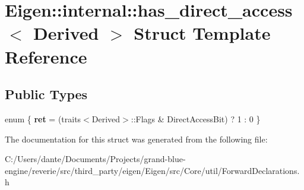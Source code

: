 \hypertarget{struct_eigen_1_1internal_1_1has__direct__access}{}\section{Eigen\+::internal\+::has\+\_\+direct\+\_\+access$<$ Derived $>$ Struct Template Reference}
\label{struct_eigen_1_1internal_1_1has__direct__access}
\subsection*{Public Types}
\begin{DoxyCompactItemize}
\item 
\mbox{\label{struct_eigen_1_1internal_1_1has__direct__access_a66475869c7c07a4ddbe884826f28d0f4}} 
enum \{ {\bfseries ret} = (traits$<$Derived$>$\+::Flags \& Direct\+Access\+Bit) ? 1 \+: 0
 \}
\end{DoxyCompactItemize}


The documentation for this struct was generated from the following file\+:\begin{DoxyCompactItemize}
\item 
C\+:/\+Users/dante/\+Documents/\+Projects/grand-\/blue-\/engine/reverie/src/third\+\_\+party/eigen/\+Eigen/src/\+Core/util/Forward\+Declarations.\+h\end{DoxyCompactItemize}
